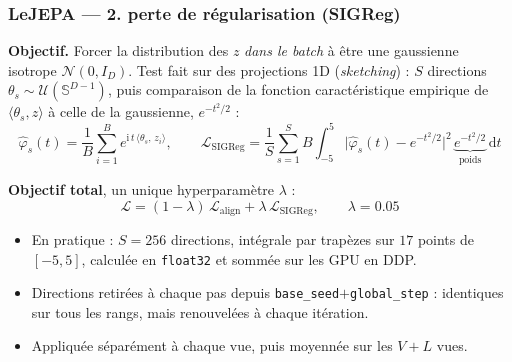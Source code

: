 \documentclass[aspectratio=169]{beamer}
\newcommand{\Lloss}{\mathcal{L}}
\begin{document}
\begin{frame}
  \frametitle{LeJEPA --- 2. perte de régularisation (SIGReg)}
  \textbf{Objectif.} Forcer la distribution des $z$ \emph{dans le batch} à être une gaussienne isotrope
  $\mathcal{N}(0, I_D)$. Test fait sur des projections 1D (\emph{sketching}) :
  $S$ directions $\theta_s \sim \mathcal{U}(\mathbb{S}^{D-1})$, puis comparaison de la fonction
  caractéristique empirique de $\langle \theta_s, z\rangle$ à celle de la gaussienne, $e^{-t^2/2}$ :
  \vspace{-0.1cm}
  \[
    \hat\varphi_s(t) = \frac{1}{B}\sum_{i=1}^{B} e^{\mathrm{i}\,t\,\langle \theta_s,\, z_i\rangle},
    \qquad
    \Lloss_{\text{SIGReg}}
    = \frac{1}{S}\sum_{s=1}^{S} B \int_{-5}^{5}
      \big|\hat\varphi_s(t) - e^{-t^2/2}\big|^2\, \underbrace{e^{-t^2/2}}_{\text{poids}}\,\mathrm{d}t
  \]

  \vspace{0.1cm}
  \textbf{Objectif total}, un unique hyperparamètre $\lambda$ :
  \vspace{-0.1cm}
  \[
    \Lloss = (1-\lambda)\,\Lloss_{\text{align}} + \lambda\,\Lloss_{\text{SIGReg}},
    \qquad \lambda = 0.05
  \]

  \vspace{-0.1cm}
  {\footnotesize
  \begin{itemize}
    \item En pratique : $S = 256$ directions, intégrale par trapèzes sur $17$ points de $[-5,5]$,
          calculée en \texttt{float32} et sommée sur les GPU en DDP.
    \item Directions retirées à chaque pas depuis \texttt{base\_seed}$+$\texttt{global\_step} :
          identiques sur tous les rangs, mais renouvelées à chaque itération.
    \item Appliquée séparément à chaque vue, puis moyennée sur les $V{+}L$ vues.
  \end{itemize}}
\end{frame}
\end{document}
